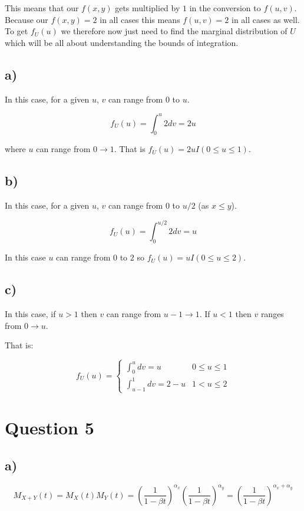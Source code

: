 \documentclass[11pt]{article}
\begin{document}
This means that our $f(x,y)$ gets multiplied by $1$ in the conversion to $f(u,v)$. Because our $f(x,y)=2$ in all cases this means $f(u,v)=2$ in all cases as well. To get $f_U(u)$ we therefore now just need to find the marginal distribution of $U$ which will be all about understanding the bounds of integration. 

\subsection*{a)}

In this case, for a given $u$, $v$ can range from $0$ to $u$. 

$$f_U(u) = \int_0^{u}2dv = 2u$$

where $u$ can range from $0\rightarrow 1$. That is $f_U(u) = 2uI(0 \leq u \leq 1)$.

\subsection*{b)}

In this case, for a given $u$, $v$ can range from $0$ to $u/2$ (as $x\leq y$). 

$$f_U(u) = \int_0^{u/2}2dv = u$$

In this case $u$ can range from $0$ to $2$ so $f_U(u) = uI(0\leq u \leq 2)$.

\subsection*{c)}

In this case, if $u>1$ then $v$ can range from $u-1 \rightarrow 1$. If $u<1$ then $v$ ranges from $0 \rightarrow u$. 

That is:

$$
f_U(u) =
   \begin{cases} 
      \int_0^u dv = u & 0\leq u \leq 1 \\
      \int_{u-1}^1 dv = 2 - u & 1 < u \leq 2
   \end{cases}
$$

\section*{Question 5}

\subsection*{a)}

$$M_{X+Y}(t) = M_X(t) M_Y(t) = \left( \frac{1}{1-\beta t}\right)^{\alpha_x} \left( \frac{1}{1-\beta t}\right)^{\alpha_y}=\left( \frac{1}{1-\beta t}\right)^{\alpha_x+\alpha_y}$$
\end{document}
